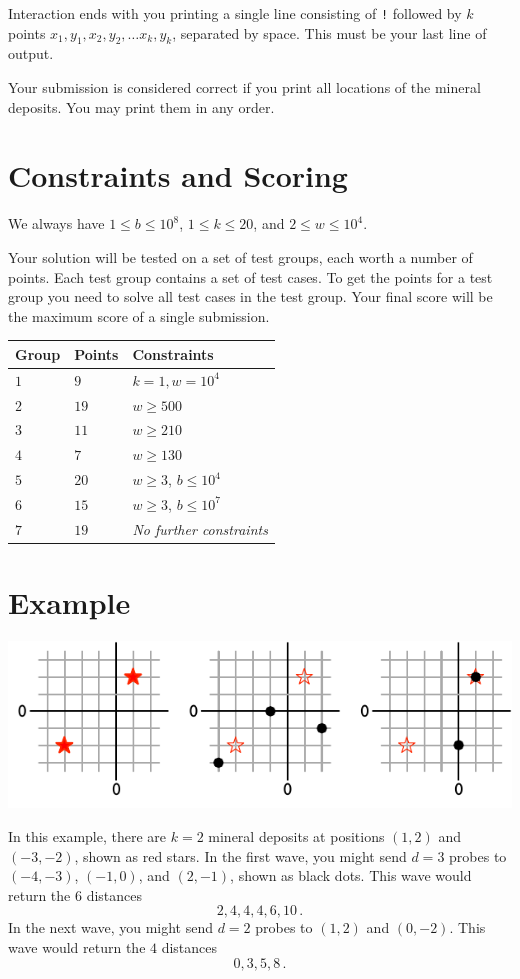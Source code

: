 Interaction ends with you printing a single line consisting of \texttt{!} followed by $k$ points $x_1, y_1, x_2, y_2, \ldots x_k, y_k$, separated by space.
This must be your last line of output.

Your submission is considered correct if you print all locations of the mineral deposits.
You may print them in any order.

\section*{Constraints and Scoring}

We always have 
$1\leq b \leq 10^8$, %
$1 \leq k \leq 20$, %
and
$2 \le w \le 10^4$. %

Your solution will be tested on a set of test groups, each worth a number of points.
Each test group contains a set of test cases.
To get the points for a test group you need to solve all test cases in the test group.
Your final score will be the maximum score of a single submission.

\medskip
\begin{tabular}{lll}
Group & Points & Constraints \\\hline
  $1$ & $9$ & $k = 1, w = 10^4$\\
  $2$ & $19$ & $w \ge 500$\\
  $3$ & $11$ & $w \ge 210$\\
  $4$ & $7$ & $w \ge 130$\\
  $5$ & $20$ & $w \ge 3$, $b \le 10^4$\\
  $6$ & $15$ & $w \ge 3$, $b \le 10^7$\\
  $7$ & $19$ & \emph{No further constraints}
\end{tabular}

\section*{Example}

\includegraphics[width=.6\textwidth]{img/sample1.pdf}

In this example, there are $k=2$ mineral deposits at positions $(1,2)$ and $(-3,-2)$, shown as red stars.
In the first wave, you might send $d=3$ probes to $(-4,-3)$, $(-1, 0)$, and $(2,-1)$, shown as black dots.
This wave would return the $6$ distances \[
  2, 4, 4, 4, 6, 10\,.
\]
In the next wave, you might send $d=2$ probes to $(1,2)$ and $(0,-2)$.
This wave would return the $4$ distances \[
  0, 3, 5, 8\,.
\]
